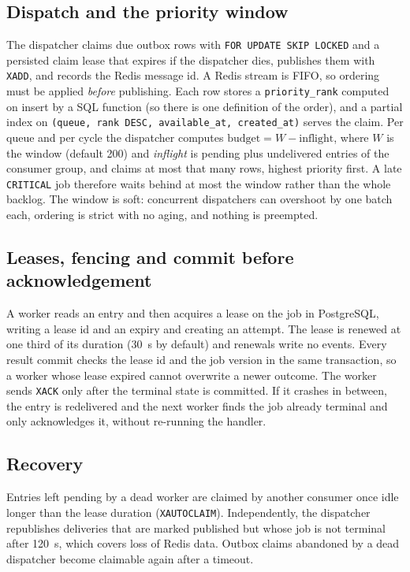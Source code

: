 \documentclass[conference]{IEEEtran}
\newcommand{\code}[1]{\texttt{\small #1}}
\begin{document}
\subsection{Dispatch and the priority window}
\label{sec:window}
The dispatcher claims due outbox rows with \code{FOR UPDATE SKIP LOCKED} and a persisted claim lease that expires if the dispatcher dies, publishes them with \code{XADD}, and records the Redis message id. A Redis stream is FIFO, so ordering must be applied \emph{before} publishing. Each row stores a \code{priority\_rank} computed on insert by a SQL function (so there is one definition of the order), and a partial index on \code{(queue, rank DESC, available\_at, created\_at)} serves the claim. Per queue and per cycle the dispatcher computes $\text{budget}=W-\text{inflight}$, where $W$ is the window (default 200) and \emph{inflight} is pending plus undelivered entries of the consumer group, and claims at most that many rows, highest priority first. A late \code{CRITICAL} job therefore waits behind at most the window rather than the whole backlog. The window is soft: concurrent dispatchers can overshoot by one batch each, ordering is strict with no aging, and nothing is preempted.

\subsection{Leases, fencing and commit before acknowledgement}
A worker reads an entry and then acquires a lease on the job in PostgreSQL, writing a lease id and an expiry and creating an attempt. The lease is renewed at one third of its duration (30~s by default) and renewals write no events. Every result commit checks the lease id and the job version in the same transaction, so a worker whose lease expired cannot overwrite a newer outcome. The worker sends \code{XACK} only after the terminal state is committed. If it crashes in between, the entry is redelivered and the next worker finds the job already terminal and only acknowledges it, without re-running the handler.

\subsection{Recovery}
Entries left pending by a dead worker are claimed by another consumer once idle longer than the lease duration (\code{XAUTOCLAIM}). Independently, the dispatcher republishes deliveries that are marked published but whose job is not terminal after 120~s, which covers loss of Redis data. Outbox claims abandoned by a dead dispatcher become claimable again after a timeout.
\end{document}
